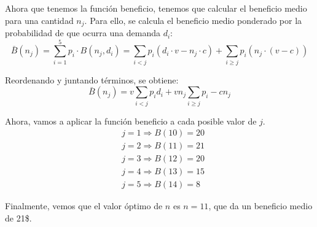 \documentclass[12pt, letterpaper]{article}
\begin{document}
\newpage
Ahora que tenemos la función beneficio, tenemos que calcular el beneficio medio para una cantidad $n_j$. Para ello, se calcula el beneficio medio ponderado por la probabilidad de que ocurra una demanda $d_i$:
\[
    \bar{B}(n_j) = \sum_{i=1}^{5} p_i \cdot B(n_j,d_i) = 
    \sum_{i<j}p_i(d_i \cdot v - n_j \cdot c) + \sum_{i \geq j}p_i(n_j \cdot (v - c))
\]

Reordenando y juntando términos, se obtiene:
\[
    \bar{B}(n_j) = 
        v\sum_{i<j}p_i d_i + 
        v n_j \sum_{i \geq j} p_i -
        c n_j
\]

Ahora, vamos a aplicar la función beneficio a cada posible valor de $j$.
\begin{align*}
    & j = 1 \Rightarrow B(10) = 20 \\
    & j = 2 \Rightarrow B(11) = 21 \\
    & j = 3 \Rightarrow B(12) = 20 \\
    & j = 4 \Rightarrow B(13) = 15 \\
    & j = 5 \Rightarrow B(14) = 8
\end{align*}

Finalmente, vemos que el valor óptimo de $n$ es $n = 11$, que da un beneficio medio de 21\$.

\newpage
\end{document}
